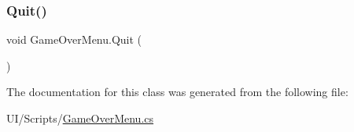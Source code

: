 \subsubsection{\texorpdfstring{Quit()}{Quit()}}
{\footnotesize\ttfamily void Game\+Over\+Menu.\+Quit (\begin{DoxyParamCaption}{ }\end{DoxyParamCaption})}



The documentation for this class was generated from the following file\+:\begin{DoxyCompactItemize}
\item 
U\+I/\+Scripts/\mbox{\hyperlink{_game_over_menu_8cs}{Game\+Over\+Menu.\+cs}}\end{DoxyCompactItemize}
